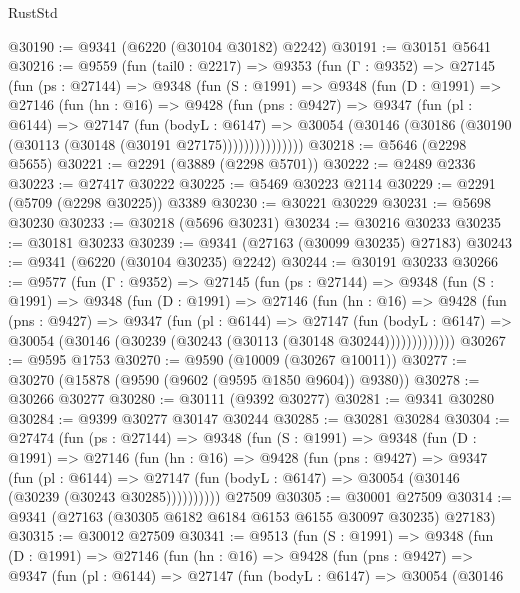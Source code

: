\begin{lexlean}{RustStd}
\begin{coremodule}
@30190 := @9341 (@6220 (@30104 @30182) @2242)
@30191 := @30151 @5641
@30216 := @9559
    (fun (tail0 : @2217) =>
    @9353
      (fun (Γ : @9352) =>
      @27145
        (fun (ps : @27144) =>
        @9348
          (fun (S : @1991) =>
          @9348
            (fun (D : @1991) =>
            @27146
              (fun (hn : @16) =>
              @9428
                (fun (pns : @9427) =>
                @9347
                  (fun (pl : @6144) =>
                  @27147
                    (fun (bodyL : @6147) =>
                    @30054 (@30146 (@30186 (@30190 (@30113 (@30148 (@30191 @27175)))))))))))))))
@30218 := @5646 (@2298 @5655)
@30221 := @2291 (@3889 (@2298 @5701))
@30222 := @2489 @2336
@30223 := @27417 @30222
@30225 := @5469 @30223 @2114
@30229 := @2291 (@5709 (@2298 @30225)) @3389
@30230 := @30221 @30229
@30231 := @5698 @30230
@30233 := @30218 (@5696 @30231)
@30234 := @30216 @30233
@30235 := @30181 @30233
@30239 := @9341 (@27163 (@30099 @30235) @27183)
@30243 := @9341 (@6220 (@30104 @30235) @2242)
@30244 := @30191 @30233
@30266 := @9577
    (fun (Γ : @9352) =>
    @27145
      (fun (ps : @27144) =>
      @9348
        (fun (S : @1991) =>
        @9348
          (fun (D : @1991) =>
          @27146
            (fun (hn : @16) =>
            @9428
              (fun (pns : @9427) =>
              @9347
                (fun (pl : @6144) =>
                @27147
                  (fun (bodyL : @6147) =>
                  @30054 (@30146 (@30239 (@30243 (@30113 (@30148 @30244)))))))))))))
@30267 := @9595 @1753
@30270 := @9590 (@10009 (@30267 @10011))
@30277 := @30270 (@15878 (@9590 (@9602 (@9595 @1850 @9604)) @9380))
@30278 := @30266 @30277
@30280 := @30111 (@9392 @30277)
@30281 := @9341 @30280
@30284 := @9399 @30277 @30147 @30244
@30285 := @30281 @30284
@30304 := @27474
    (fun (ps : @27144) =>
    @9348
      (fun (S : @1991) =>
      @9348
        (fun (D : @1991) =>
        @27146
          (fun (hn : @16) =>
          @9428
            (fun (pns : @9427) =>
            @9347
              (fun (pl : @6144) =>
              @27147 (fun (bodyL : @6147) => @30054 (@30146 (@30239 (@30243 @30285))))))))))
    @27509
@30305 := @30001 @27509
@30314 := @9341 (@27163 (@30305 @6182 @6184 @6153 @6155 @30097 @30235) @27183)
@30315 := @30012 @27509
@30341 := @9513
    (fun (S : @1991) =>
    @9348
      (fun (D : @1991) =>
      @27146
        (fun (hn : @16) =>
        @9428
          (fun (pns : @9427) =>
          @9347
            (fun (pl : @6144) =>
            @27147
              (fun (bodyL : @6147) =>
              @30054
                (@30146

\end{coremodule}
\end{lexlean}
